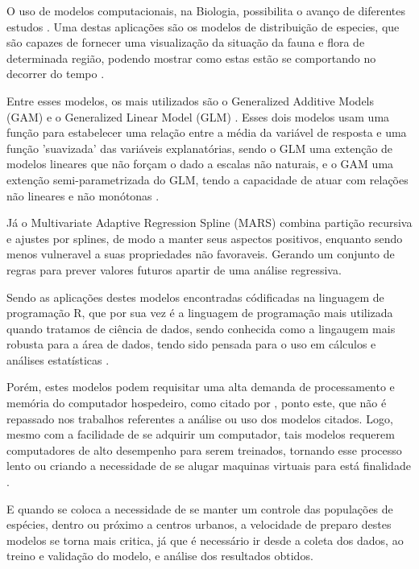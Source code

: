 \documentclass[
	12pt,				%
	openright,			%
	oneside,			%
	a4paper,			%
	english,			%
	brazil				%
	]{abntex2}
\begin{document}
O uso de modelos computacionais, na Biologia, possibilita o avanço de diferentes
estudos \cite{modelagem_comp}. Uma destas aplicações são os modelos de distribuição 
de especies, que são capazes de fornecer uma visualização da situação 
da fauna e flora de determinada região, podendo mostrar como estas estão se 
comportando no decorrer do tempo \cite{speciesDistributionModels}.

Entre esses modelos, os mais utilizados são o Generalized Additive Models (GAM) \cite{GAM}
e o Generalized Linear Model (GLM) \cite{GLM}. Esses dois modelos usam uma função para 
estabelecer uma relação entre a média da variável de resposta e uma função 'suavizada'
das variáveis explanatórias, sendo o GLM uma extenção de modelos lineares que não
forçam o dado a escalas não naturais, e o GAM uma extenção semi-parametrizada do GLM,
tendo a capacidade de atuar com relações não lineares e não monótonas \cite{GAMeGLM_especie_estudo}. 

Já o Multivariate Adaptive Regression Spline (MARS) combina partição recursiva e ajustes
por splines, de modo a manter seus aspectos positivos, enquanto sendo menos vulneravel a 
suas propriedades não favoraveis. Gerando um conjunto de regras para prever
valores futuros apartir de uma análise regressiva. \cite{MARS} 

Sendo as aplicações destes modelos encontradas códificadas na linguagem de programação R, que por
sua vez é a linguagem de programação mais utilizada quando tratamos de ciência de dados, sendo conhecida
como a lingaugem mais robusta para a área de dados, tendo sido pensada para o uso em cálculos e
análises estatísticas \cite{linguagem_r}.

Porém, estes modelos podem requisitar uma alta demanda de processamento e memória do computador hospedeiro, 
como citado por \cite{modelagem_comp}, ponto este, que não é repassado nos trabalhos referentes a análise 
ou uso dos modelos citados. Logo, mesmo com a facilidade de se adquirir um computador, tais modelos
requerem computadores de alto desempenho para serem treinados, tornando esse processo lento ou criando 
a necessidade de se alugar maquinas virtuais para está finalidade \cite{global_cloud_maketing}. 

E quando se coloca a necessidade de se manter um controle das populações de espécies, dentro ou próximo
a centros urbanos, a velocidade de preparo destes modelos se torna mais critica, já que é necessário ir
desde a coleta dos dados, ao treino e validação do modelo, e análise dos resultados obtidos.
 
\end{document}
